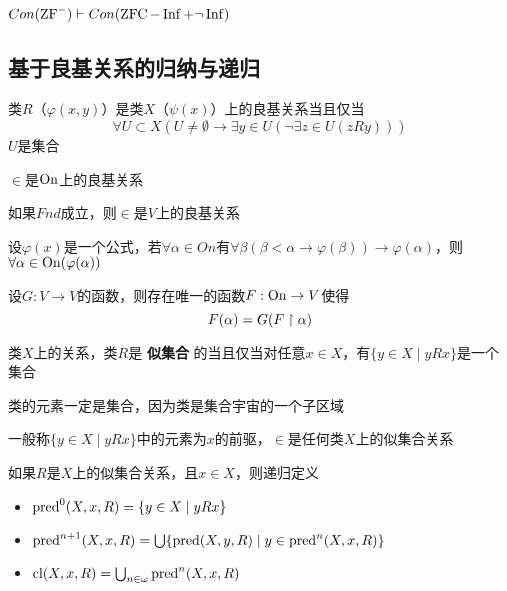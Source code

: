 \documentclass[11pt]{article}
\begin{document}
\begin{corollary}[]
\(Con(\text{ZF}^-)\vdash Con(\operatorname{ZFC}-\operatorname{Inf}+\neg\operatorname{Inf})\)
\end{corollary}
\subsection{基于良基关系的归纳与递归}
\label{sec:orgdd7fe06}
\begin{definition}[]
类\(R\)（\(\varphi(x,y)\)）是类\(X\)（\(\psi(x)\)）上的良基关系当且仅当
\begin{equation*}
\forall U\subset X(U\neq\emptyset\to\exists y\in U(\neg\exists z\in U(zRy)))
\end{equation*}
\(U\)是集合
\end{definition}

\begin{examplle}[]
\(\in\)是\(\operatorname{On}\)上的良基关系

如果\(Fnd\)成立，则\(\in\)是\(V\)上的良基关系
\end{examplle}

\begin{theorem}[超穷归纳原理]
设\(\varphi(x)\)是一个公式，若\(\forall\alpha\in On\)有\(\forall\beta(\beta<\alpha\to\varphi(\beta))\to\varphi(\alpha)\)，则\(\forall\alpha\in\operatorname{On}(\varphi(\alpha))\)
\end{theorem}

\begin{theorem}[超穷递归定理]
设\(G:V\to V\)的函数，则存在唯一的函数\(F:\operatorname{On}\to V\)使得
\begin{equation*}
F(\alpha)=G(F\upharpoonright\alpha)
\end{equation*}
\end{theorem}

\begin{definition}[]
类\(X\)上的关系，类\(R\)是 \textbf{似集合} 的当且仅当对任意\(x\in X\)，有\(\{y\in X\mid yRx\}\)是一个集合
\end{definition}

类的元素一定是集合，因为类是集合宇宙的一个子区域

一般称\(\{y\in X\mid yRx\}\)中的元素为\(x\)的前驱，\(\in\)是任何类\(X\)上的似集合关系

\begin{definition}[]
如果\(R\)是\(X\)上的似集合关系，且\(x\in X\)，则递归定义
\begin{itemize}
\item \(\text{pred}^0(X,x,R)=\{y\in X\mid yRx\}\)
\item \(\text{pred}^{n+1}(X,x,R)=\bigcup\{\text{pred}(X,y,R)\mid y\in\text{pred}^n(X,x,R)\}\)
\item \(\operatorname{\text{cl}}(X,x,R)=\bigcup_{n\in\omega}\text{pred}^n(X,x,R)\)
\end{itemize}
\end{definition}
\end{document}
